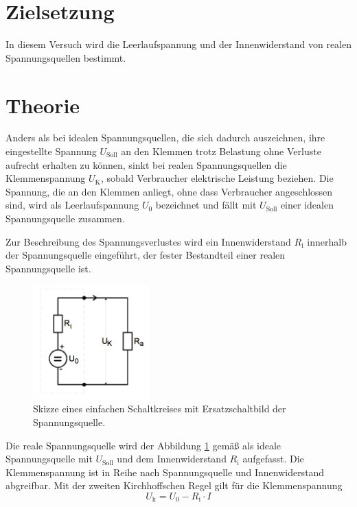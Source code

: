 \section{Zielsetzung}
In diesem Versuch wird die Leerlaufspannung und der Innenwiderstand von realen Spannungsquellen bestimmt.

\section{Theorie}
\label{sec:Theorie}
Anders als bei idealen Spannungsquellen, die sich dadurch auszeichnen, ihre eingestellte Spannung $U_\text{Soll}$ an den Klemmen trotz Belastung ohne Verluste aufrecht erhalten zu können, 
sinkt bei realen Spannungsquellen die Klemmenspannung $U_\text{K}$, sobald Verbraucher elektrische Leistung beziehen.
Die Spannung, die an den Klemmen anliegt, ohne dass Verbraucher angeschlossen sind, 
wird als Leerlaufspannung $U_0$ bezeichnet und fällt mit $U_\text{Soll}$ einer idealen Spannungsquelle zusammen.

Zur Beschreibung des Spannungsverlustes wird ein Innenwiderstand $R_\text{i}$ innerhalb der Spannungsquelle eingeführt, der fester Bestandteil einer realen Spannungsquelle ist.
\begin{figure}[ht]
	\centering
  	\includegraphics[width=0.4\textwidth]{Bilder/Innenwiderstand}
	\caption{Skizze eines einfachen Schaltkreises mit Ersatzschaltbild der Spannungsquelle.}
	\label{fig:Innenleben}
\end{figure}
Die reale Spannungsquelle wird der Abbildung \ref{fig:Innenleben} gemäß als ideale Spannungsquelle mit $U_\text{Soll}$ und dem Innenwiderstand $R_\text{i}$ aufgefasst. 
Die Klemmenspannung ist in Reihe nach Spannungsquelle und Innenwiderstand abgreifbar.
Mit der zweiten Kirchhoffschen Regel gilt für die Klemmenspannung
\begin{equation}
	U_\text{k} = U_\text{0} - R_\text{i}\cdot I
	\label{eq:Klemmspannung}
\end{equation}

